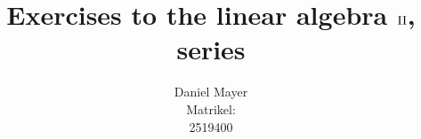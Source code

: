 \documentclass[a4paper,10pt]{article}
\title{Exercises to the linear algebra $\RN{2}$,\\
series }
\author{Daniel Mayer\\
Matrikel:\\
2519400}
\begin{document}
\maketitle

\section{}
\end{document}
